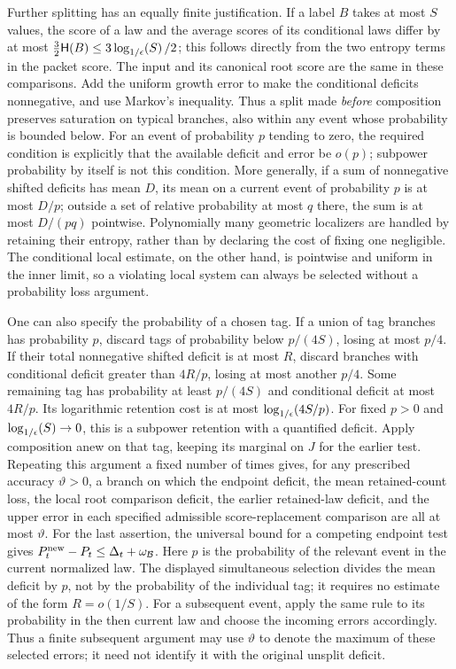 Further splitting has an equally finite justification.  If a label
$B$ takes at most $S$ values, the score of a law and the average scores
of its conditional laws differ by at most
$\tfrac32\mathsf H(B)\le3\log_{1/\epsilon}\!\left(S\right)/2$; this follows directly from the two
entropy terms in the packet score.  The input and its canonical root
score are the same in these comparisons.  Add the uniform growth
error to make the conditional deficits nonnegative, and use Markov's
inequality.  Thus a split made \emph{before} composition preserves
saturation on typical branches, also within any event whose probability
is bounded below.  For an event of probability $p$ tending to zero,
the required condition is explicitly that the available deficit and
error be $o(p)$; subpower probability by itself is not this condition.
More generally, if a sum of nonnegative shifted deficits has mean
$D$, its mean on a current event of probability $p$ is at most
$D/p$; outside a set of relative probability at most $q$ there,
the sum is at most $D/(pq)$ pointwise.
Polynomially many geometric localizers are handled by retaining their
entropy, rather than by declaring the cost of fixing one negligible.
The conditional local estimate, on the other hand, is pointwise and
uniform in the inner limit, so a violating local system can always be
selected without a probability loss argument.

One can also specify the probability of a chosen tag.  If a union of
tag branches has probability $p$, discard tags of probability below
$p/(4S)$, losing at most $p/4$.  If their total nonnegative shifted
deficit is at most $R$, discard branches with conditional deficit
greater than $4R/p$, losing at most another $p/4$.  Some remaining
tag has probability at least $p/(4S)$ and conditional deficit at most
$4R/p$.  Its logarithmic retention cost is at most
$\log_{1/\epsilon}\!\left(4S/p\right)$.  For fixed $p>0$ and $\log_{1/\epsilon}\!\left(S\right)\to0$, this is a subpower
retention with a quantified deficit.  Apply composition anew on that
tag, keeping its marginal on $J$ for the earlier test.  Repeating this
argument a fixed number of times gives, for any prescribed accuracy
$\vartheta>0$, a branch on which the endpoint deficit, the mean
retained-count loss, the local root comparison deficit, the earlier
retained-law deficit, and the upper error in each specified admissible
score-replacement comparison are all at most $\vartheta$.  For the
last assertion, the universal bound for a competing endpoint test
gives $P_t^{\rm new}-P_t\le\Delta_t+\omega_{\mathcal B}$.
Here $p$ is the probability of the relevant event in the current
normalized law. The displayed simultaneous selection divides the
mean deficit by $p$, not by the probability of the individual tag;
it requires no estimate of the form $R=o(1/S)$.
For a subsequent event, apply the same rule to its probability in
the then current law and choose the incoming errors accordingly.
Thus a finite subsequent argument may use $\vartheta$ to denote the
maximum of these selected errors; it need not identify it with the
original unsplit deficit.

